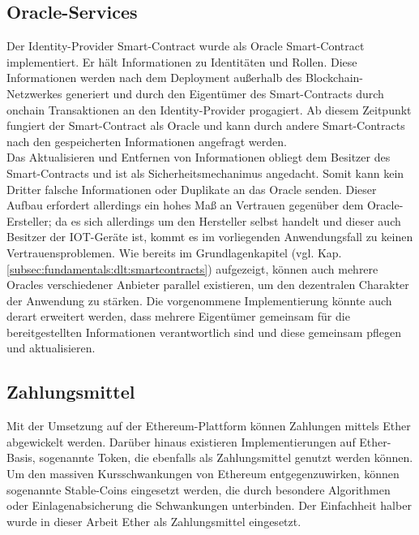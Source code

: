 \subsection{Oracle-Services}
\label{subsec:implementation:requirements:oracle}
Der Identity-Provider Smart-Contract wurde als Oracle Smart-Contract implementiert. Er hält Informationen zu Identitäten und Rollen. Diese Informationen werden nach dem Deployment außerhalb des Blockchain-Netzwerkes generiert und durch den Eigentümer des Smart-Contracts durch onchain Transaktionen an den Identity-Provider progagiert. Ab diesem Zeitpunkt fungiert der Smart-Contract als Oracle und kann durch andere Smart-Contracts nach den gespeicherten Informationen angefragt werden.\\
Das Aktualisieren und Entfernen von Informationen obliegt dem Besitzer des Smart-Contracts und ist als Sicherheitsmechanimus angedacht. Somit kann kein Dritter falsche Informationen oder Duplikate an das Oracle senden. Dieser Aufbau erfordert allerdings ein hohes Maß an Vertrauen gegenüber dem Oracle-Ersteller; da es sich allerdings um den Hersteller selbst handelt und dieser auch Besitzer der \ac{IOT}-Geräte ist, kommt es im vorliegenden Anwendungsfall zu keinen Vertrauensproblemen. Wie bereits im Grundlagenkapitel (vgl. Kap. \ref{subsec:fundamentals:dlt:smartcontracts}) aufgezeigt, können auch mehrere Oracles verschiedener Anbieter parallel existieren, um den dezentralen Charakter der Anwendung zu stärken. Die vorgenommene Implementierung könnte auch derart erweitert werden, dass mehrere Eigentümer gemeinsam für die bereitgestellten Informationen verantwortlich sind und diese gemeinsam pflegen und aktualisieren.

\subsection{Zahlungsmittel}
\label{subsec:implementation:requirements:payment}
Mit der Umsetzung auf der Ethereum-Plattform können Zahlungen mittels Ether abgewickelt werden. Darüber hinaus existieren Implementierungen auf Ether-Basis, sogenannte Token, die ebenfalls als Zahlungsmittel genutzt werden können. Um den massiven Kursschwankungen von Ethereum entgegenzuwirken, können sogenannte Stable-Coins eingesetzt werden, die durch besondere Algorithmen oder Einlagenabsicherung die Schwankungen unterbinden. Der Einfachheit halber wurde in dieser Arbeit Ether als Zahlungsmittel eingesetzt.\\


